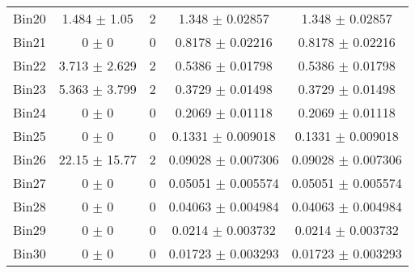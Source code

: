 \begin{tabular}{@{\extracolsep{4pt}}lcccc@{}}
     Bin20 & 1.484 $\pm$ 1.05 & 2 & 1.348 $\pm$ 0.02857 & 1.348 $\pm$ 0.02857 \\ 
     Bin21 & 0 $\pm$ 0 & 0 & 0.8178 $\pm$ 0.02216 & 0.8178 $\pm$ 0.02216 \\ 
     Bin22 & 3.713 $\pm$ 2.629 & 2 & 0.5386 $\pm$ 0.01798 & 0.5386 $\pm$ 0.01798 \\ 
     Bin23 & 5.363 $\pm$ 3.799 & 2 & 0.3729 $\pm$ 0.01498 & 0.3729 $\pm$ 0.01498 \\ 
     Bin24 & 0 $\pm$ 0 & 0 & 0.2069 $\pm$ 0.01118 & 0.2069 $\pm$ 0.01118 \\ 
     Bin25 & 0 $\pm$ 0 & 0 & 0.1331 $\pm$ 0.009018 & 0.1331 $\pm$ 0.009018 \\ 
     Bin26 & 22.15 $\pm$ 15.77 & 2 & 0.09028 $\pm$ 0.007306 & 0.09028 $\pm$ 0.007306 \\ 
     Bin27 & 0 $\pm$ 0 & 0 & 0.05051 $\pm$ 0.005574 & 0.05051 $\pm$ 0.005574 \\ 
     Bin28 & 0 $\pm$ 0 & 0 & 0.04063 $\pm$ 0.004984 & 0.04063 $\pm$ 0.004984 \\ 
     Bin29 & 0 $\pm$ 0 & 0 & 0.0214 $\pm$ 0.003732 & 0.0214 $\pm$ 0.003732 \\ 
     Bin30 & 0 $\pm$ 0 & 0 & 0.01723 $\pm$ 0.003293 & 0.01723 $\pm$ 0.003293 \\ 
\hline\hline
  \end{tabular}

